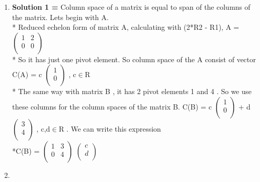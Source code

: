 \documentclass[11pt]{article}
\begin{document}
\begin{enumerate}

\item \textbf{Solution 1 = }
Column space of a matrix is equal to span of the columns of the matrix.
Lets begin with A.
\\*  Reduced echelon form of matrix A, calculating with (2*R2 - R1),  A = 
$
\begin{pmatrix}
1&2\\
0&0\\
\end{pmatrix}
$
\\* So it has just one pivot element. So column space of the A consist of vector  C(A) = c 
$
\begin  {pmatrix}
1\\
0\\
\end{pmatrix}
$
, c$\in$R
\\* The same way with matrix B , it has 2 pivot elements 1 and 4 . So we use these columns for the column spaces of the matrix B.  C(B) = c $
\begin  {pmatrix}
1\\
0\\
\end{pmatrix}
$ + d  $
\begin  {pmatrix}
3\\
4\\
\end{pmatrix}
$ , c,d$\in$R . We can write this expression \\*C(B) = $ \begin  {pmatrix}
1&3\\
0&4\\
\end{pmatrix}
$
$
\begin  {pmatrix}
c\\
d\\
\end{pmatrix}
$
\item 
{}
\end{enumerate}
\end{document}
